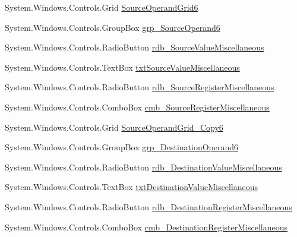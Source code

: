 \begin{DoxyCompactItemize}
System.\+Windows.\+Controls.\+Grid \hyperlink{class_c_p_u___o_s___simulator_1_1_instructions_window_a1036ae92003998bc7e7062a73358adec}{Source\+Operand\+Grid6}
\item 
System.\+Windows.\+Controls.\+Group\+Box \hyperlink{class_c_p_u___o_s___simulator_1_1_instructions_window_a46c1f50385d01108637e574343a99bfd}{grp\+\_\+\+Source\+Operand6}
\item 
System.\+Windows.\+Controls.\+Radio\+Button \hyperlink{class_c_p_u___o_s___simulator_1_1_instructions_window_ae6e33f7879251b63282f5d3eaa693507}{rdb\+\_\+\+Source\+Value\+Miscellaneous}
\item 
System.\+Windows.\+Controls.\+Text\+Box \hyperlink{class_c_p_u___o_s___simulator_1_1_instructions_window_a555d604d5869d89442a35900abc35914}{txt\+Source\+Value\+Miscellaneous}
\item 
System.\+Windows.\+Controls.\+Radio\+Button \hyperlink{class_c_p_u___o_s___simulator_1_1_instructions_window_ad2b0098ef721214b53b9e3241e611a84}{rdb\+\_\+\+Source\+Register\+Miscellaneous}
\item 
System.\+Windows.\+Controls.\+Combo\+Box \hyperlink{class_c_p_u___o_s___simulator_1_1_instructions_window_a98245ef6ca4796b7f59fe4b9937a388e}{cmb\+\_\+\+Source\+Register\+Miscellaneous}
\item 
System.\+Windows.\+Controls.\+Grid \hyperlink{class_c_p_u___o_s___simulator_1_1_instructions_window_a3dfdd68ad6b08fb1612fd43a420e5193}{Source\+Operand\+Grid\+\_\+\+Copy6}
\item 
System.\+Windows.\+Controls.\+Group\+Box \hyperlink{class_c_p_u___o_s___simulator_1_1_instructions_window_a8e457b3503625b5e837320ad9eb439c6}{grp\+\_\+\+Destination\+Operand6}
\item 
System.\+Windows.\+Controls.\+Radio\+Button \hyperlink{class_c_p_u___o_s___simulator_1_1_instructions_window_a567c8bba810d30e3c382e527e132a230}{rdb\+\_\+\+Destination\+Value\+Miscellaneous}
\item 
System.\+Windows.\+Controls.\+Text\+Box \hyperlink{class_c_p_u___o_s___simulator_1_1_instructions_window_a7fa1615bacb3264ac8ce61787a28d477}{txt\+Destination\+Value\+Miscellaneous}
\item 
System.\+Windows.\+Controls.\+Radio\+Button \hyperlink{class_c_p_u___o_s___simulator_1_1_instructions_window_adc4aa664244631ae1240a81d5c3b8ab5}{rdb\+\_\+\+Destination\+Register\+Miscellaneous}
\item 
System.\+Windows.\+Controls.\+Combo\+Box \hyperlink{class_c_p_u___o_s___simulator_1_1_instructions_window_ac4dab6ef32a46a295d6937b6bbda7813}{cmb\+\_\+\+Destination\+Register\+Miscellaneous}

\end{DoxyCompactItemize}
